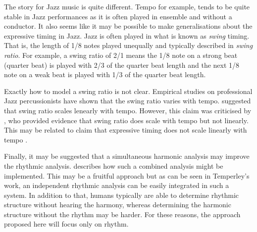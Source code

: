 The story for Jazz music is quite different. Tempo for example, tends to be quite stable in Jazz performances as it is often played in ensemble and without a conductor. It also seems like it may be possible to make generalisations about the expressive timing in Jazz. Jazz is often played in what is known as \textit{swing} timing. That is, the length of 1/8 notes played unequally and typically described in \textit{swing ratio}. For example, a swing ratio of 2/1 means the 1/8 note on a strong beat (quarter beat) is played with 2/3 of the quarter beat length and the next 1/8 note on a weak beat is played with 1/3 of the quarter beat length.

Exactly how to model a swing ratio is not clear. Empirical studies on professional Jazz percussionists have shown that the swing ratio varies with tempo. \citet{friberg2002swing} suggested that swing ratio scales lenearly with tempo. However, this claim was criticised by \citet{honing2008swing}, who provided evidence that swing ratio does scale with tempo but not linearly. This may be related to claim that expressive timing does not scale linearly with tempo \citep{desain1993tempo, desain1994does}.

Finally, it may be suggested that a simultaneous harmonic analysis may improve the rhythmic analysis. \citet{temperley2009unified} describes how such a combined analysis might be implemented. This may be a fruitful approach but as can be seen in Temperley's work, an independent rhythmic analysis can be easily integrated in such a system. In addition to that, humans typically are able to determine rhythmic structure without hearing the harmony, whereas determining the harmonic structure without the rhythm may be harder. For these reasons, the approach proposed here will focus only on rhythm.
